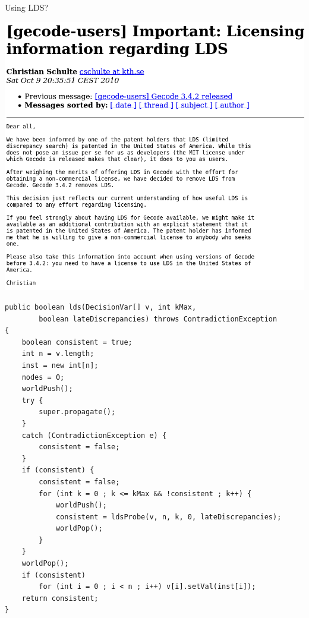 \documentclass{beamer}
\begin{document}
\begin{frame}{Using LDS?}
    \begin{center}
        \includegraphics*[keepaspectratio=true,scale=0.2]{images/lds-patent.png}
    \end{center}
\end{frame}

\newsavebox{\mycodeboxa}
\newsavebox{\mycodeboxb}

\begin{lrbox}{\mycodeboxa}
    \tiny\ttfamily
\begin{lstlisting}
public boolean lds(DecisionVar[] v, int kMax,
        boolean lateDiscrepancies) throws ContradictionException
{
    boolean consistent = true;
    int n = v.length;
    inst = new int[n];
    nodes = 0;
    worldPush();
    try {
        super.propagate();
    }
    catch (ContradictionException e) {
        consistent = false;
    }
    if (consistent) {
        consistent = false;
        for (int k = 0 ; k <= kMax && !consistent ; k++) {
            worldPush();
            consistent = ldsProbe(v, n, k, 0, lateDiscrepancies);
            worldPop();
        }
    }
    worldPop();
    if (consistent)
        for (int i = 0 ; i < n ; i++) v[i].setVal(inst[i]);
    return consistent;
}
\end{lstlisting}
\end{lrbox}
\end{document}
